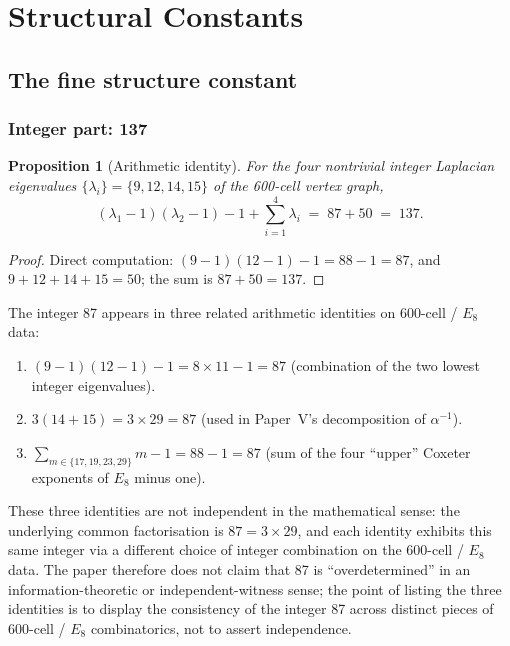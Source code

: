 \documentclass[12pt]{article}
\newtheorem{proposition}[theorem]{Proposition}
\begin{document}
\section{Structural Constants}\label{sec:constants}

\subsection{The fine structure constant}

\subsubsection*{Integer part: 137}

\begin{proposition}[Arithmetic identity]\label{prop:137}
For the four nontrivial integer Laplacian eigenvalues $\{\lambda_i\} = \{9, 12, 14, 15\}$ of the 600-cell vertex graph,
\begin{equation}
    (\lambda_1 - 1)(\lambda_2 - 1) - 1 + \sum_{i=1}^4 \lambda_i \;=\; 87 + 50 \;=\; 137.
\end{equation}
\end{proposition}

\begin{proof}
Direct computation: $(9 - 1)(12 - 1) - 1 = 88 - 1 = 87$, and $9 + 12 + 14 + 15 = 50$; the sum is $87 + 50 = 137$.
\end{proof}

The integer 87 appears in three related arithmetic identities on 600-cell / $E_8$ data:
\begin{enumerate}
    \item $(9-1)(12-1) - 1 = 8 \times 11 - 1 = 87$ (combination of the two lowest integer eigenvalues).
    \item $3(14 + 15) = 3 \times 29 = 87$ (used in Paper~V's decomposition of $\alpha^{-1}$).
    \item $\sum_{m \in \{17, 19, 23, 29\}} m - 1 = 88 - 1 = 87$ (sum of the four ``upper'' Coxeter exponents of $E_8$ minus one).
\end{enumerate}
These three identities are not independent in the mathematical sense: the underlying common factorisation is $87 = 3 \times 29$, and each identity exhibits this same integer via a different choice of integer combination on the 600-cell / $E_8$ data. The paper therefore does not claim that 87 is ``overdetermined'' in an information-theoretic or independent-witness sense; the point of listing the three identities is to display the consistency of the integer 87 across distinct pieces of 600-cell / $E_8$ combinatorics, not to assert independence.
\end{document}
